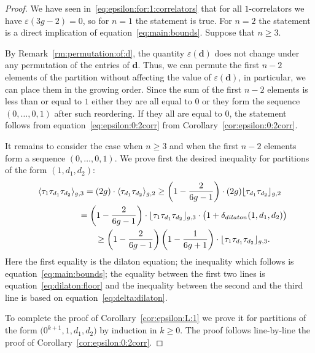 \documentclass[11pt]{article}
\renewcommand{\epsilon}{\varepsilon}
\theoremstyle{definition}
\begin{document}
\begin{proof}We have seen in~\eqref{eq:epsilon:for:1:correlators}
that for all $1$-correlators we have
$\epsilon(3g-2)=0$,
so for $n=1$ the statement is true.
For $n=2$ the statement is a direct implication
of equation~\eqref{eq:main:bounds}.
Suppose that $n\ge 3$.

By Remark~\ref{rm:permutation:of:d}, the quantity
$\epsilon(\boldsymbol{d})$ does not change under any permutation of the entries of $\boldsymbol{d}$. Thus, we can permute the first $n-2$ elements of the partition without affecting the value of $\epsilon(\boldsymbol{d})$, in particular, we can place them in the growing order. Since the sum of the first $n-2$
elements is less than or equal to $1$ either they are all
equal to $0$ or they form the sequence $(0,\dots,0,1)$
after such reordering. If they all are equal to $0$, the
statement follows from equation~\eqref{eq:epsilon:0:2corr}
from Corollary~\eqref{cor:epsilon:0:2corr}.

It remains to consider the case when $n\ge 3$ and when the first $n-2$ elements form a sequence $(0,\dots,0,1)$. We prove first the desired inequality for partitions of the form $(1,d_1,d_2)$:
\begin{gather*}
\langle \tau_1\tau_{d_1}\tau_{d_2}\rangle_{g,3}
=(2g)\cdot\langle \tau_{d_1} \tau_{d_2}\rangle_{g,2}
\ge\left(1-\frac{2}{6g-1}\right)\cdot
(2g)\lfloor \tau_{d_1}\tau_{d_2}\rfloor_{g,2}
\\
\hphantom{\langle \tau_1\tau_{d_1}\tau_{d_2}\rangle_{g,3}}{}
=\left(1-\frac{2}{6g-1}\right)\cdot
\lfloor \tau_1\tau_{d_1}\tau_{d_2}\rfloor_{g,3}
\cdot\big(1+\delta_{\rm dilaton}(1,d_1,d_2)\big)
\\
\hphantom{\langle \tau_1\tau_{d_1}\tau_{d_2}\rangle_{g,3}}{}
\ge\left(1-\frac{2}{6g-1}\right)\left(1-\frac{1}{6g+1}\right)
\cdot\lfloor \tau_1\tau_{d_1}\tau_{d_2}\rfloor_{g,3} .
\end{gather*}
Here the first equality is the dilaton equation;
the inequality which follows is
equation~\eqref{eq:main:bounds}; the equality
between the first two lines is equation~\eqref{eq:dilaton:floor}
and the inequality between the second and the third line
is based on equation~\eqref{eq:delta:dilaton}.

To complete the proof of Corollary~\ref{cor:epsilon:L:1} we prove it for partitions of the form
$\big(0^{k+1},1,d_1,d_2\big)$ by induction in $k\ge 0$. The proof follows line-by-line the proof of Corollary~\ref{cor:epsilon:0:2corr}.
\end{proof}
\end{document}
